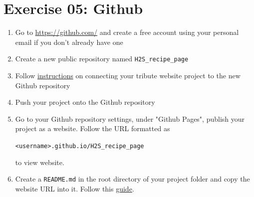 \documentclass{42-en}
\begin{document}

\chapter{Exercise 05: Github}

\exnumber{\exercicenumber}

\makeheaderfiles

\begin{enumerate}
    \item Go to \url{https://github.com/} and create a free account using your personal email if you don't already have one
    \item Create a new public repository named \texttt{H2S\_recipe\_page}
    \item Follow \href{https://help.github.com/en/articles/adding-a-remote}{instructions} on connecting your tribute website project to the new Github repository
    \item Push your project onto the Github repository
    \item Go to your Github repository settings, under "Github Pages", publish your project as a website. Follow the URL formatted as
    \begin{center}
        \texttt{<username>.github.io/H2S\_recipe\_page} \\
    \end{center}
    to view website.
    \item Create a \texttt{README.md} in the root directory of your project folder and copy the website URL into it. Follow this \href{https://help.github.com/en/articles/basic-writing-and-formatting-syntax#headings}{guide}.
\end{enumerate}

\end{document}
